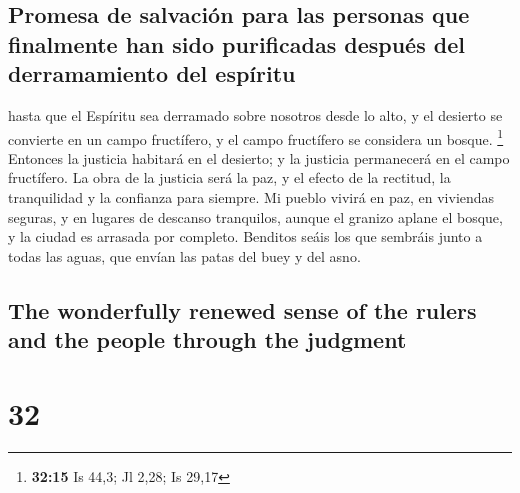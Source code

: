\begin{paracol}{2}
\hypertarget{promesa-de-salvaciuxf3n-para-las-personas-que-finalmente-han-sido-purificadas-despuuxe9s-del-derramamiento-del-espuxedritu}{%
\subsection{Promesa de salvación para las personas que finalmente han
sido purificadas después del derramamiento del
espíritu}\label{promesa-de-salvaciuxf3n-para-las-personas-que-finalmente-han-sido-purificadas-despuuxe9s-del-derramamiento-del-espuxedritu}}

 hasta que el Espíritu sea derramado sobre nosotros desde
lo alto, y el desierto se convierte en un campo fructífero, y el campo
fructífero se considera un bosque. \footnote{\textbf{32:15} Is 44,3; Jl
  2,28; Is 29,17}  Entonces la justicia habitará en el
desierto; y la justicia permanecerá en el campo fructífero.
 La obra de la justicia será la paz, y el efecto de la
rectitud, la tranquilidad y la confianza para siempre. 
Mi pueblo vivirá en paz, en viviendas seguras, y en lugares de descanso
tranquilos,  aunque el granizo aplane el bosque, y la
ciudad es arrasada por completo.  Benditos seáis los que
sembráis junto a todas las aguas, que envían las patas del buey y del
asno.

\switchcolumn
\begin{otherlanguage}{english}

\hypertarget{the-wonderfully-renewed-sense-of-the-rulers-and-the-people-through-the-judgment}{%
\subsection{The wonderfully renewed sense of the rulers and the people
through the
judgment}\label{the-wonderfully-renewed-sense-of-the-rulers-and-the-people-through-the-judgment}}

\hypertarget{section-63}{%
\section{32}\label{section-63}}


\end{otherlanguage}
\end{paracol}

